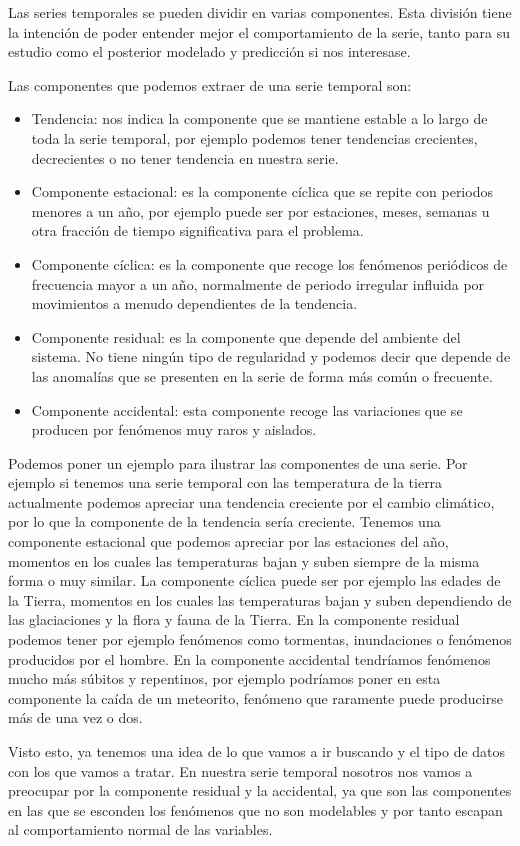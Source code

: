 Las series temporales se pueden dividir en varias componentes. Esta división tiene la intención de poder entender mejor el comportamiento de la serie, tanto para su estudio como el posterior modelado y predicción si nos interesase.

Las componentes que podemos extraer de una serie temporal son:

\begin{itemize}
	\item Tendencia: nos indica la componente que se mantiene estable a lo largo de toda la serie temporal, por ejemplo podemos tener tendencias crecientes, decrecientes o no tener tendencia en nuestra serie.
	\item Componente estacional: es la componente cíclica que se repite con periodos menores a un año, por ejemplo puede ser por estaciones, meses, semanas u otra fracción de tiempo significativa para el problema.
	\item Componente cíclica: es la componente que recoge los fenómenos periódicos de frecuencia mayor a un año, normalmente de periodo irregular influida por movimientos a menudo dependientes de la tendencia.
	\item Componente residual: es la componente que depende del ambiente del sistema. No tiene ningún tipo de regularidad y podemos decir que depende de las anomalías que se presenten en la serie de forma más común o frecuente.
	\item Componente accidental: esta componente recoge las variaciones que se producen por fenómenos muy raros y aislados.
\end{itemize}

Podemos poner un ejemplo para ilustrar las componentes de una serie. Por ejemplo si tenemos una serie temporal con las temperatura de la tierra actualmente podemos apreciar una tendencia creciente por el cambio climático, por lo que la componente de la tendencia sería creciente. Tenemos una componente estacional que podemos apreciar por las estaciones del año, momentos en los cuales las temperaturas bajan y suben siempre de la misma forma o muy similar. La componente cíclica puede ser por ejemplo las edades de la Tierra, momentos en los cuales las temperaturas bajan y suben dependiendo de las glaciaciones y la flora y fauna de la Tierra. En la componente residual podemos tener por ejemplo fenómenos como tormentas, inundaciones o fenómenos producidos por el hombre. En la componente accidental tendríamos fenómenos mucho más súbitos y repentinos, por ejemplo podríamos poner en esta componente la caída de un meteorito, fenómeno que raramente puede producirse más de una vez o dos.

Visto esto, ya tenemos una idea de lo que vamos a ir buscando y el tipo de datos con los que vamos a tratar. En nuestra serie temporal nosotros nos vamos a preocupar por la componente residual y la accidental, ya que son las componentes en las que se esconden los fenómenos que no son modelables y por tanto escapan al comportamiento normal de las variables.